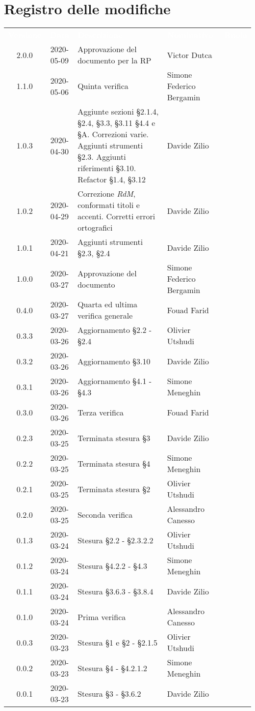 \section*{Registro delle modifiche}
{
	\centering
	\begin{longtable}{ c c  C{4cm}  C{3cm}  C{3.5cm} }
		\textcolor{white}{\textbf{Versione}} & \textcolor{white}{\textbf{Data}} & \textcolor{white}{\textbf{Descrizione}} & \textcolor{white}{\textbf{Nominativo}} & \textcolor{white}{\textbf{Ruolo}}\\
	2.0.0 & 2020-05-09 & Approvazione del documento per la RP & Victor Dutca &\Res{}\\
	1.1.0 & 2020-05-06 & Quinta verifica & Simone Federico Bergamin &\ver{}\\
	1.0.3 & 2020-04-30 & Aggiunte sezioni \S 2.1.4, \S 2.4, \S 3.3, \S 3.11 \S 4.4 e \S A. Correzioni varie. Aggiunti strumenti \S 2.3. Aggiunti riferimenti \S 3.10. Refactor \S 1.4, \S 3.12 & Davide Zilio &\adm{} \\
	1.0.2 & 2020-04-29 & Correzione \textit{RdM}, conformati titoli e accenti. Corretti errori ortografici & Davide Zilio &\adm{} \\
	1.0.1 & 2020-04-21 & Aggiunti strumenti \S 2.3, \S 2.4 & Davide Zilio &\adm{} \\	
    1.0.0 & 2020-03-27 & Approvazione del documento & Simone Federico Bergamin &\Res{} \\
    	0.4.0 & 2020-03-27 & Quarta ed ultima verifica generale & Fouad Farid &\ver{}\\
    	0.3.3 & 2020-03-26 & Aggiornamento \S 2.2 - \S 2.4 & Olivier Utshudi &\adm{}\\
		0.3.2 & 2020-03-26 & Aggiornamento \S 3.10 & Davide Zilio &\adm{}\\
		0.3.1 & 2020-03-26 & Aggiornamento \S 4.1 - \S 4.3  & Simone Meneghin &\adm{}\\
		0.3.0 & 2020-03-26 & Terza verifica & Fouad Farid &\ver{}\\
		0.2.3 & 2020-03-25 & Terminata stesura \S 3  & Davide Zilio &\adm{}\\
    	0.2.2 & 2020-03-25 & Terminata stesura \S 4 & Simone Meneghin &\adm{}\\	
   		0.2.1 & 2020-03-25 & Terminata stesura \S 2 & Olivier Utshudi &\adm{}\\
   		0.2.0 & 2020-03-25 & Seconda verifica & Alessandro Canesso &\ver{}\\
		0.1.3 & 2020-03-24 & Stesura \S 2.2 - \S 2.3.2.2 & Olivier Utshudi &\adm{}\\
		0.1.2 & 2020-03-24 & Stesura \S 4.2.2 - \S 4.3 & Simone Meneghin &\adm{}\\		
		0.1.1 & 2020-03-24 & Stesura \S 3.6.3 - \S 3.8.4 & Davide Zilio &\adm{}\\
		0.1.0 & 2020-03-24 & Prima verifica & Alessandro Canesso &\ver{}\\
		0.0.3 & 2020-03-23 & Stesura \S 1 e \S 2 - \S 2.1.5 & Olivier Utshudi &\adm{}\\
		0.0.2 & 2020-03-23 & Stesura \S 4 - \S 4.2.1.2 & Simone Meneghin &\adm{}\\
		0.0.1 & 2020-03-23 & Stesura \S 3 - \S 3.6.2 & Davide Zilio &\adm{}\\		
	\end{longtable}
}